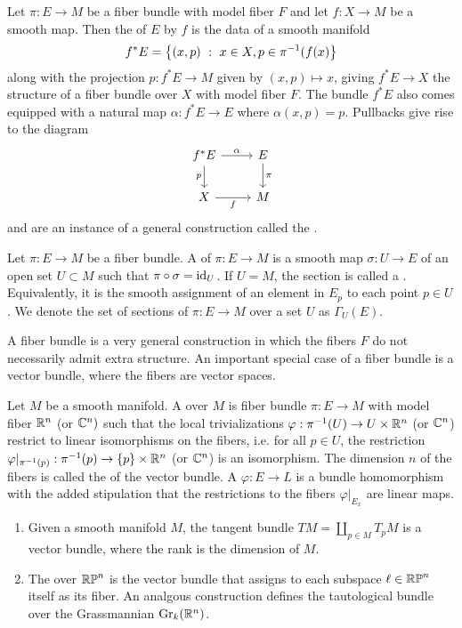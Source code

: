 \begin{defn}
Let $\pi : E \to M$ be a fiber bundle with model fiber $F$
and let $f : X \to M$ be a smooth map. Then the  of $E$ by $f$ is
the data of a smooth manifold
\[
f^*E = \left\lbrace (x, p)~:~ x \in X, p \in \pi^{-1}(f(x)  \right\rbrace
\]
along with the projection $p : f^*E \to M$ given by $(x,p) \mapsto x$, giving
$f^*E \to X$ the structure of a fiber bundle over $X$ with model fiber $F$.
The bundle $f^*E$ also comes equipped with a natural map $\alpha : f^*E \to E$
where $\alpha(x,p) = p$. Pullbacks give rise to the diagram
\[\begin{tikzcd}
f^*E \ar[d, "p"']\ar[r, "\alpha"] & E \ar[d, "\pi"] \\
X \ar[r, "f"']& M
\end{tikzcd}\]
and are an instance of a general construction called the .
\end{defn}
%
\begin{defn}
Let $\pi : E \to M$ be a fiber bundle. A  of $\pi : E \to M$
is a smooth map $\sigma : U \to E$ of an open set $U \subset M$ such that
$\pi \circ \sigma = \operatorname{id}_U$. If $U = M$, the section is called a .
Equivalently, it is the smooth assignment of an element in $E_p$ to each point
$p \in U$. We denote the set of sections of $\pi : E \to M$ over a set $U$
as $\Gamma_U(E)$.
\end{defn}
%
A fiber bundle is a very general construction in which the fibers $F$ do
not necessarily admit extra structure. An important special case of a fiber bundle
is a vector bundle, where the fibers are vector spaces.
%
\begin{defn}
Let $M$ be a smooth manifold. A  over $M$ is fiber bundle
$\pi : E \to M$ with model fiber $\mathbb{R}^n$ (or $\mathbb{C}^n)$ such that the local
trivializations $\varphi : \pi^{-1}(U) \to U \times \mathbb{R}^n$ (or $\mathbb{C}^n$)
restrict to linear isomorphisms on the fibers, i.e. for all $p \in U$, the restriction
$\varphi\vert_{\pi^{-1}(p)} : \pi^{-1}(p) \to \left\lbrace p \right\rbrace \times \mathbb{R}^n$
(or $\mathbb{C}^n$) is an isomorphism. The dimension $n$ of the fibers is called the
 of the vector bundle. A 
$\varphi : E \to L$ is a bundle homomorphism with the added stipulation that
the restrictions to the fibers $\varphi\vert_{E_x}$ are linear maps.
\end{defn}
%
\begin{exmp} \enumbreak
\begin{enumerate}
  \item Given a smooth manifold $M$, the tangent bundle $TM = \coprod_{p \in M} T_pM$
  is a vector bundle, where the rank is the dimension of $M$.
  \item The  over $\mathbb{RP}^n$ is the vector bundle that
  assigns to each subspace $\ell \in \mathbb{RP}^n$ itself as its fiber. An analgous
  construction defines the tautological bundle over the Grassmannian
  $\mathrm{Gr}_k(\mathbb{R}^n)$.
\end{enumerate}
\end{exmp}

